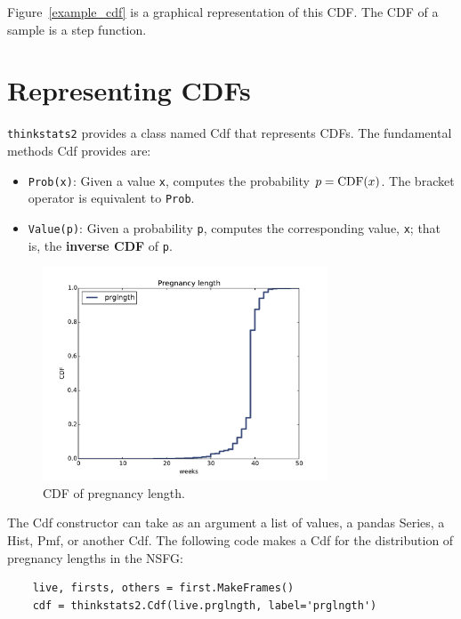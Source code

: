\documentclass[12pt]{book}
\begin{document}
Figure~\ref{example_cdf} is a graphical representation of this CDF.
The CDF of a sample is a step function.


\section{Representing CDFs}

{\tt thinkstats2} provides a class named Cdf that represents
CDFs.  The fundamental methods Cdf provides are:

\begin{itemize}

\item {\tt Prob(x)}: Given a value {\tt x}, computes the probability
  $p = \mathrm{CDF}(x)$.  The bracket operator is equivalent to {\tt Prob}.

\item {\tt Value(p)}: Given a probability {\tt p}, computes the
corresponding value, {\tt x}; that is, the {\bf inverse CDF} of {\tt p}.

\end{itemize}

\begin{figure}
\centerline{\includegraphics[height=2.5in]{figs/cumulative_prglngth_cdf.pdf}}
\caption{CDF of pregnancy length.}
\label{cumulative_prglngth_cdf}
\end{figure}

The Cdf constructor can take as an argument a list of values,
a pandas Series, a Hist, Pmf, or another Cdf.  The following
code makes a Cdf for the distribution of pregnancy lengths in
the NSFG:

\begin{verbatim}
    live, firsts, others = first.MakeFrames()
    cdf = thinkstats2.Cdf(live.prglngth, label='prglngth')
\end{verbatim}
\end{document}
